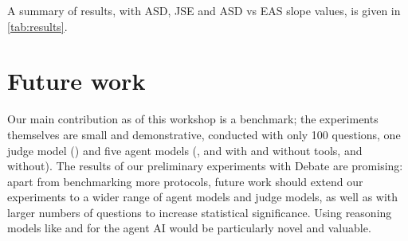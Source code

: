 A summary of results, with ASD, JSE and ASD vs EAS slope values, is given in \cref{tab:results}.



\section{Future work}

Our main contribution as of this workshop is a benchmark; the experiments themselves are small and demonstrative, conducted with only 100 questions, one judge model (\gptmini{}) and five agent models (\claudenewsonnet{}, and \claudehaiku{} with and without tools, and \deepseek{} without). The results of our preliminary experiments with Debate are promising: apart from benchmarking more protocols, future work should extend our experiments to a wider range of agent models and judge models, as well as with larger numbers of questions to increase statistical significance. Using reasoning models like \deepseekr{} and \othree{} for the agent AI would be particularly novel and valuable.
